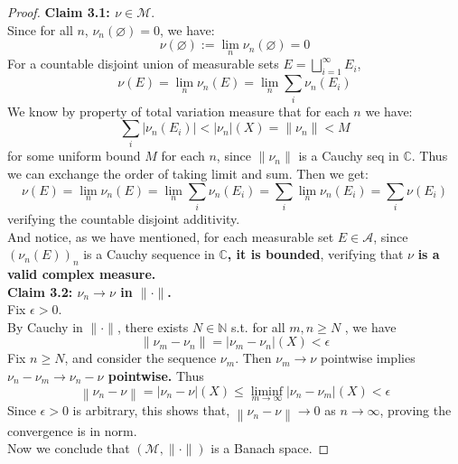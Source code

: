 \documentclass[lang=cn,11pt]{elegantbook}
\begin{document}
\begin{proof}
\textbf{Claim 3.1: $\nu \in \mathcal{M}$}.\\
Since for all $n$, $\nu_n(\varnothing) = 0$, we have:
\[
\nu(\varnothing) := \lim_n \nu_n(\varnothing) = 0
\]
For a countable disjoint union of measurable sets \(E = \bigsqcup_{i=1}^\infty E_i\), \[
  \nu(E) =  \lim_n   \nu_n(E) = \lim_n \sum_i \nu_n(E_i)
\]We know by property of total variation measure that for each $n$ we have: \[
\sum_i |\nu_n(E_i)| <  |\nu_n| (X) = \| \nu_n\| <M 
\]for some uniform bound $M$ for each $n$, since $\|\nu_n\|$ is a Cauchy seq in $\mathbb{C}$. Thus we can exchange the order of taking limit and sum. Then we get: \[
  \nu(E) = \lim_n \nu_n(E) = \lim_n \sum_i  \nu_n(E_i) = \sum_i \lim_n \nu_n(E_i) = \sum_i \nu(E_i)
  \]
verifying the countable disjoint additivity. \\
And notice, as we have mentioned, for each measurable set $E\in \mathcal{A}$, since $(\nu_n(E))_n$ is a Cauchy sequence in $\mathbb{C}$\textbf{, it is bounded}, verifying that $\nu$ \textbf{is a valid complex measure.}\\
\textbf{Claim 3.2: $\nu_n \to \nu$ in $\|\cdot\|$.}\\
Fix $\epsilon > 0$.\\
By Cauchy in $\| \cdot \|$, there exists $N \in \mathbb{N}$ s.t. for all $m,n \geq N$
, we have \[
 \|\nu_m - \nu_n \| = |\nu_m - \nu_n| (X) < \epsilon
\]Fix $n \geq N$, and consider the sequence $\nu_m$. Then $\nu_m \rightarrow \nu$ pointwise implies \textbf{$\nu_n-\nu_m \rightarrow \nu_n-\nu$ pointwise. } Thus
$$
\left\|\nu_n-\nu\right\| =  | \nu_n - \nu| (X)  \leq \liminf _{m \rightarrow \infty} |\nu_n - \nu_m| (X)<\epsilon
$$
Since $\epsilon > 0$ is arbitrary, this shows that, $\left\|\nu_n-\nu\right\| \rightarrow 0$ as $n\to \infty$, proving the convergence is in norm.\\
Now we conclude that $(\mathcal{M}, \| \cdot \|)$ is a Banach space.
\end{proof}
\end{document}
